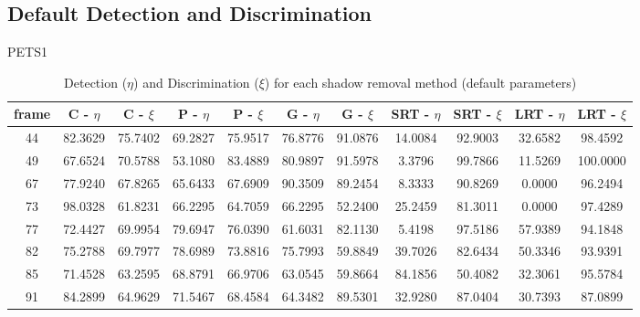 \clearpage
\begin{appendices}



\chapter{Default Detection and Discrimination}

\begin{table}
\centering
\caption{PETS1}
\caption*{Detection ($\eta$) and Discrimination ($\xi$) for each shadow removal method (default parameters)}
\begin{tabular}{ |c|c|c|c|c|c|c|c|c|c|c| }
	\hline
\textbf{frame} &  \textbf{C - $\eta$} &  \textbf{C - $\xi$} &  \textbf{P - $\eta$} &  \textbf{P - $\xi$} &  \textbf{G - $\eta$} &  \textbf{G - $\xi$} &  \textbf{SRT - $\eta$} &  \textbf{SRT - $\xi$} &  \textbf{LRT - $\eta$} &  \textbf{LRT - $\xi$} \\
\hline
\hline
44 & 82.3629 &  75.7402 &   69.2827 &  75.9517 &   76.8776 &  91.0876 &   14.0084 &  92.9003 &   32.6582 &  98.4592 \\
\hline
49 & 67.6524 &  70.5788 &   53.1080 &  83.4889 &   80.9897 &  91.5978 &   3.3796 &  99.7866 &   11.5269 &  100.0000 \\
\hline
67 & 77.9240 &  67.8265 &   65.6433 &  67.6909 &   90.3509 &  89.2454 &   8.3333 &  90.8269 &   0.0000 &  96.2494 \\
\hline
73 & 98.0328 &  61.8231 &   66.2295 &  64.7059 &   66.2295 &  52.2400 &   25.2459 &  81.3011 &   0.0000 &  97.4289 \\
\hline
77 & 72.4427 &  69.9954 &   79.6947 &  76.0390 &   61.6031 &  82.1130 &   5.4198 &  97.5186 &   57.9389 &  94.1848 \\
\hline
82 & 75.2788 &  69.7977 &   78.6989 &  73.8816 &   75.7993 &  59.8849 &   39.7026 &  82.6434 &   50.3346 &  93.9391 \\
\hline
85 & 71.4528 &  63.2595 &   68.8791 &  66.9706 &   63.0545 &  59.8664 &   84.1856 &  50.4082 &   32.3061 &  95.5784 \\
\hline
91 & 84.2899 &  64.9629 &   71.5467 &  68.4584 &   64.3482 &  89.5301 &   32.9280 &  87.0404 &   30.7393 &  87.0899 \\

\end{tabular}
\end{table}
\end{appendices}

